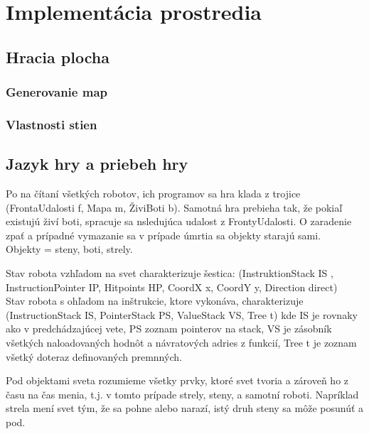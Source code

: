 \chapter{Implementácia prostredia}
\section{Hracia plocha} %
\subsection{Generovanie map}%
\subsection{Vlastnosti stien} %
\section{Jazyk hry a priebeh hry} %
Po na čítaní všetkých robotov, ich programov sa hra klada z trojice (FrontaUdalosti f, Mapa m, ŽiviBoti b). Samotná hra prebieha tak, že pokiaľ existujú živí boti, spracuje sa nsledujúca udalost z FrontyUdalosti. O zaradenie zpať a prípadné vymazanie sa v prípade úmrtia sa objekty starajú sami.\\
Objekty = steny, boti, strely. \\
\begin{definicia}
Stav robota vzhľadom na svet charakterizuje šestica: (InstruktionStack IS , InstructionPointer IP, Hitpoints HP, CoordX x, CoordY y, Direction direct)\\
Stav robota s ohľadom na inštrukcie, ktore vykonáva, charakterizuje (InstructionStack IS, PointerStack PS, ValueStack VS, Tree t) kde IS je rovnaky ako v predchádzajúcej vete, PS zoznam pointerov na stack, VS je zásobník všetkých naloadovaných hodnôt a návratových adries z funkcií, Tree t je zoznam všetký doteraz definovaných premnných.\\
\end{definicia}

\begin{definicia} 
Pod objektami sveta rozumieme všetky prvky, ktoré svet tvoria a zároveň ho z času na čas menia, t.j. v tomto prípade strely, steny, a samotní roboti. Napríklad strela mení svet tým, že sa pohne alebo narazí, istý druh steny sa môže posunúť a pod.
\end{definicia}

